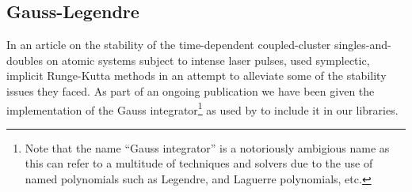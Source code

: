%
        \subsection{Gauss-Legendre}
            In an article on the stability of the time-dependent coupled-cluster
            singles-and-doubles on atomic systems subject to intense laser
            pulses, \citeauthor{pedersen2018symplectic}
            \cite{pedersen2018symplectic} used symplectic, implicit Runge-Kutta
            methods in an attempt to alleviate some of the stability issues they
            faced.
            As part of an ongoing publication we have been given the
            implementation of the Gauss integrator\footnote{%
                Note that the name ``Gauss integrator'' is a notoriously
                ambigious name as this can refer to a multitude of techniques
                and solvers due to the use of named polynomials such as
                Legendre, and Laguerre polynomials, etc.%
            } as used by \citeauthor{pedersen2018symplectic}
            \cite{pedersen2018symplectic} to include it in our libraries.
